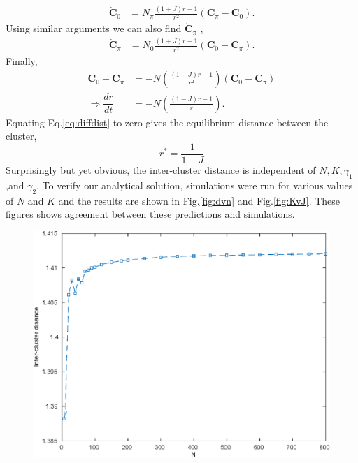 \documentclass[twocolumn,10pt]{asme2ej}
\begin{document}
{{\begin{align}
            \dot{\mathbf{C}}_0 &= N_\pi \frac{(1+J) r - 1}{r^2} (\mathbf{C}_\pi - \mathbf{C}_0). 
        \end{align}
        Using similar arguments we can also find \(\dot{\mathbf{C}}_\pi\) ,
        \begin{align}
            \dot{\mathbf{C}}_\pi &= N_0 \frac{(1+J) r - 1}{r^2} (\mathbf{C}_0 - \mathbf{C}_\pi).
        \end{align}
        Finally,
        \begin{align}
            \dot{\mathbf{C}}_0 - \dot{\mathbf{C}}_\pi &= -N \left(\frac{(1-J)r -1}{r^2}\right)(\mathbf{C}_0 - \mathbf{C}_\pi) \nonumber \\
            \Rightarrow \dfrac{dr}{dt} &= -N \left(\frac{(1-J)r -1}{r}\right). \label{eq:diffdist}
        \end{align}
        Equating Eq.\ref*{eq:diffdist} to zero gives the equilibrium distance between the cluster,
        \begin{equation}\label{eq:eqdist}
            r^* = \frac{1}{1-J}
        \end{equation} %
        Surprisingly but yet obvious, the inter-cluster distance is independent of \(N,K,\gamma_1\),and \(\gamma_2\). To verify our analytical solution, simulations were run for various values of \(N\) and \(K\) and the results are shown in Fig.\ref{fig:dvn} and Fig.\ref{fig:KvJ}. These figures shows agreement between these predictions and simulations. 
        \begin{figure}[h!]
            \includegraphics[width = \linewidth]{dvn.eps}

\end{figure}}}
\end{document}
